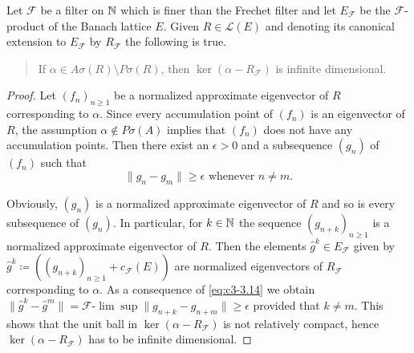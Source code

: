 \begin{lemma}\label{lem:c3-3.10}
	
	Let $\mathcal{F}$ be a filter on $\mathbb{N}$ which is finer than the Frechet filter and let $E_{\mathcal{F}}$ be the $\mathcal{F}$-product of the Banach lattice $E$.
	Given $R \in \mathcal{L}(E)$ and denoting its canonical extension to $E_{\mathcal{F}}$ by $R_{\mathcal{F}}$ the following is true.
\begin{quote}
	If $\alpha \in A\sigma(R)\setminus P\sigma(R)$, then $\ker(\alpha - R_{\mathcal{F}})$ is infinite dimensional.
\end{quote}
\end{lemma}
\begin{proof}
    Let $(f_{n})_{n\geq 1}$ be a normalized approximate eigenvector of $R$ corresponding to $\alpha$.
    Since every accumulation point of $(f_{n})$ is an eigenvector of $R$, the assumption $\alpha \notin P\sigma(A)$ implies that $(f_{n})$ does not have any accumulation points.
    Then there exist an $\epsilon > 0$ and a subsequence $(g_{n})$ of $(f_{n})$ such that
    \begin{equation}\label{eq:c3-3.14}
        \|g_{n} - g_{m}\| \geq \epsilon \text{ whenever } n \neq m.
    \end{equation}
    
    Obviously, $(g_{n})$ is a normalized approximate eigenvector of $R$ and so is every subsequence of $(g_{n})$.
    In particular, for $k \in \mathbb{N}$ the sequence $(g_{n+k})_{n\geq 1}$ is a normalized approximate eigenvector of $R$.
    Then the elements $\hat{g}^{k} \in E_{\mathcal{F}}$ given by $\hat{g}^{k} \coloneqq ((g_{n+k})_{n\geq 1} + c_{\mathcal{F}}(E))$ are normalized eigenvectors of $R_{\mathcal{F}}$ corresponding to $\alpha$.
    As a consequence of \eqref{eq:c3-3.14} we obtain
    $\|\hat{g}^{k} - \hat{g}^{m}\| = \mathcal{F}\text{-}\lim\sup\|g_{n+k} - g_{n+m}\| \geq \epsilon$ provided that $k \neq m$.
    This shows that the unit ball in $\ker(\alpha - R_{\mathcal{F}})$ is not relatively compact, hence $\ker(\alpha - R_{\mathcal{F}})$ has to be infinite dimensional.
\end{proof}

